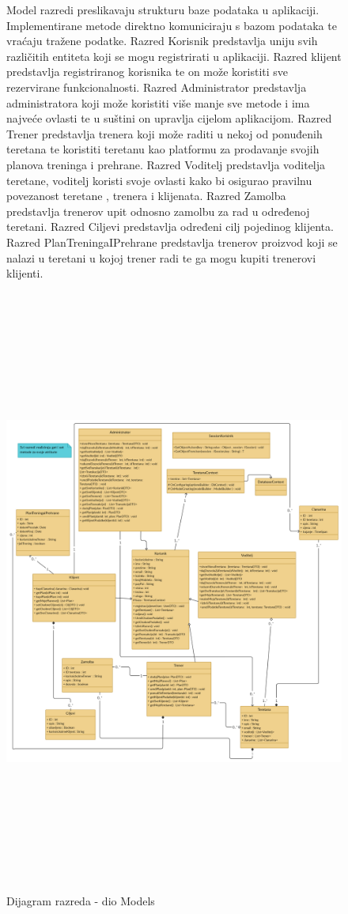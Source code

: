 		\begin{figure}
		    Model razredi preslikavaju strukturu baze podataka u aplikaciji. Implementirane metode direktno komuniciraju s bazom podataka te vraćaju tražene podatke. Razred Korisnik predstavlja uniju svih različitih entiteta koji se mogu registrirati u aplikaciji. Razred klijent predstavlja registriranog korisnika te on može koristiti sve rezervirane funkcionalnosti. Razred Administrator predstavlja administratora koji može koristiti više manje sve metode i ima najveće ovlasti te u suštini on upravlja cijelom aplikacijom. Razred Trener predstavlja trenera koji može raditi u nekoj od ponuđenih teretana te koristiti teretanu kao platformu za prodavanje svojih planova treninga i prehrane. Razred Voditelj predstavlja voditelja teretane, voditelj koristi svoje ovlasti kako bi osigurao pravilnu povezanost teretane , trenera i klijenata. Razred Zamolba predstavlja trenerov upit odnosno zamolbu za rad u određenoj teretani. Razred Ciljevi predstavlja određeni cilj pojedinog klijenta. Razred PlanTreningaIPrehrane predstavlja trenerov proizvod koji se nalazi u teretani u kojoj trener radi te ga mogu kupiti trenerovi klijenti.
		\end{figure}
		\begin{figure}[H]
			\includegraphics[height= 20cm,width=1.2\textwidth]{dijagrami/modelsClass.jpg}
			\centering
			\caption{Dijagram razreda - dio Models}
			\label{fig:promjene}
		\end{figure}
	
